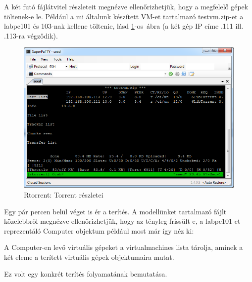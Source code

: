 A két futó fájlátvitel részleteit megnézve ellenőrizhetjük, hogy a megfelelő gépek töltenek-e le. Például a mi általunk készített VM-et tartalmazó testvm.zip-et a labpc101 és 103-nak kellene töltenie, lásd \ref{fig:seed_peers}-os~ábra (a két gép IP címe .111 ill. .113-ra végződik).

\begin{figure}[ht]
\centering
\includegraphics[width=140mm, keepaspectratio]{figures/test_seed_peers.png}
\caption{Rtorrent: Torrent részletei}
\label{fig:seed_peers}
\end{figure}

Egy pár percen belül véget is ér a terítés. A modellünket tartalmazó fájlt közelebbről megnézve ellenőrizhetjük, hogy az tényleg frissült-e, a labpc101-et reprezentáló Computer objektum például most már így néz ki:


A Computer-en levő virtuális gépeket a virtualmachines lista tárolja, aminek a két eleme a terített virtuális gépek objektumaira mutat.

Ez volt egy konkrét terítés folyamatának bemutatása.
